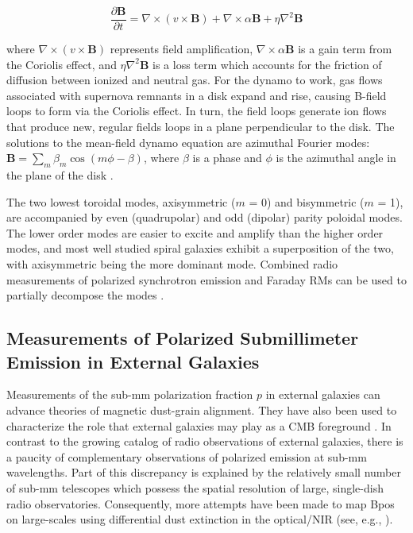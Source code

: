\begin{equation}\label{eq:dynamo}
\frac{\partial \textbf{B}}{\partial t} = \nabla \times (v \times \textbf{B}) + \nabla \times \alpha \textbf{B} + \eta \nabla^{2} \textbf{B}
\end{equation}

where $\nabla \times (v \times \textbf{B})$ represents field amplification, $\nabla \times \alpha \textbf{B}$ is a gain term from the Coriolis effect, and $\eta \nabla^{2} \textbf{B}$ is a loss term which accounts for the friction of diffusion between ionized and neutral gas. For the dynamo to work, gas flows associated with supernova remnants in a disk expand and rise, causing B-field loops to form via the Coriolis effect. In turn, the field loops generate ion flows that produce new, regular fields loops in a plane perpendicular to the disk. The solutions to the mean-field dynamo equation are azimuthal Fourier modes: $\boldsymbol{B} = \sum_{m} \beta_{m}\cos(m\phi - \beta)$, where $\beta$ is a phase and $\phi$ is the azimuthal angle in the plane of the disk \citep{sofue1985large}.

The two lowest toroidal modes, axisymmetric ($m$ = 0) and bisymmetric ($m$ = 1), are accompanied by even (quadrupolar) and odd (dipolar) parity poloidal modes. The lower order modes are easier to excite and amplify than the higher order modes, and most well studied spiral galaxies exhibit a superposition of the two, with axisymmetric being the more dominant mode. Combined radio measurements of polarized synchrotron emission and Faraday RMs can be used to partially decompose the modes \citep{beck2008measuring}.

\subsection{Measurements of Polarized Submillimeter Emission in External Galaxies}

Measurements of the sub-mm polarization fraction $p$ in external galaxies can advance theories of magnetic dust-grain alignment. They have also been used to characterize the role that external galaxies may play as a CMB foreground \citep{seiffert2006upper}. In contrast to the growing catalog of radio observations of external galaxies, there is a paucity of complementary observations of polarized emission at sub-mm wavelengths. Part of this discrepancy is explained by the relatively small number of sub-mm telescopes which possess the spatial resolution of large, single-dish radio observatories. Consequently, more attempts have been made to map \gls{Bpos} on large-scales using differential dust extinction in the optical/NIR (see, e.g., \citet{fendt1998spiral}).

